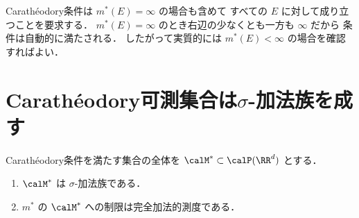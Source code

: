 \begin{remark}
Carath\'eodory条件は $m^*(E) = \infty$ の場合も含めて
すべての $E$ に対して成り立つことを要求する．
$m^*(E) = \infty$ のとき右辺の少なくとも一方も $\infty$ だから
条件は自動的に満たされる．
したがって実質的には $m^*(E) < \infty$ の場合を確認すればよい．
\end{remark}

\section{Carath\'eodory可測集合は\texorpdfstring{$\sigma$}{σ}-加法族を成す}
\label{sec:caratheodory-sigma}

\begin{theorem}\label{thm:caratheodory-sigma}
Carath\'eodory条件を満たす集合の全体を
$\calM^* \subset \calP(\RR^d)$ とする．
\begin{enumerate}
\item $\calM^*$ は $\sigma$-加法族である．
\item $m^*$ の $\calM^*$ への制限は完全加法的測度である．
\end{enumerate}
\end{theorem}
